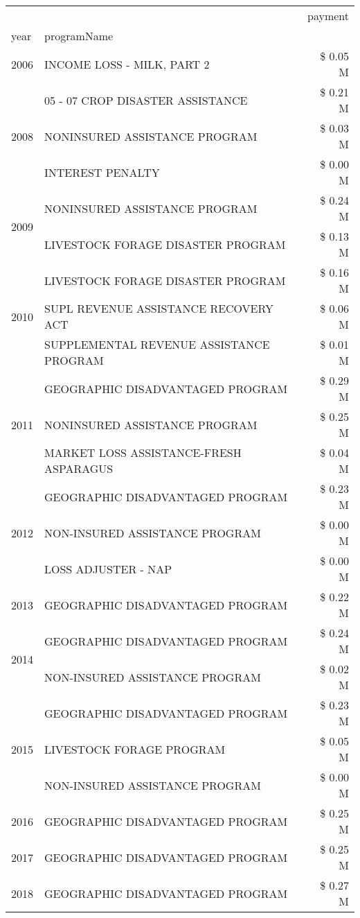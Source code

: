 \begin{tabular}{llr}
\toprule
 &  & payment \\
year & programName &  \\
\midrule
2006 & INCOME LOSS - MILK, PART 2 & \$ 0.05 M \\
\cline{1-3}
\multirow[t]{3}{*}{2008} & 05 - 07 CROP DISASTER ASSISTANCE & \$ 0.21 M \\
 & NONINSURED ASSISTANCE PROGRAM & \$ 0.03 M \\
 & INTEREST PENALTY & \$ 0.00 M \\
\cline{1-3}
\multirow[t]{2}{*}{2009} & NONINSURED ASSISTANCE PROGRAM & \$ 0.24 M \\
 & LIVESTOCK FORAGE DISASTER  PROGRAM & \$ 0.13 M \\
\cline{1-3}
\multirow[t]{3}{*}{2010} & LIVESTOCK FORAGE DISASTER  PROGRAM & \$ 0.16 M \\
 & SUPL REVENUE ASSISTANCE RECOVERY ACT & \$ 0.06 M \\
 & SUPPLEMENTAL REVENUE ASSISTANCE PROGRAM & \$ 0.01 M \\
\cline{1-3}
\multirow[t]{3}{*}{2011} & GEOGRAPHIC DISADVANTAGED PROGRAM & \$ 0.29 M \\
 & NONINSURED ASSISTANCE PROGRAM & \$ 0.25 M \\
 & MARKET LOSS ASSISTANCE-FRESH ASPARAGUS & \$ 0.04 M \\
\cline{1-3}
\multirow[t]{3}{*}{2012} & GEOGRAPHIC DISADVANTAGED PROGRAM & \$ 0.23 M \\
 & NON-INSURED ASSISTANCE PROGRAM & \$ 0.00 M \\
 & LOSS ADJUSTER - NAP & \$ 0.00 M \\
\cline{1-3}
2013 & GEOGRAPHIC DISADVANTAGED PROGRAM & \$ 0.22 M \\
\cline{1-3}
\multirow[t]{2}{*}{2014} & GEOGRAPHIC DISADVANTAGED PROGRAM & \$ 0.24 M \\
 & NON-INSURED ASSISTANCE PROGRAM & \$ 0.02 M \\
\cline{1-3}
\multirow[t]{3}{*}{2015} & GEOGRAPHIC DISADVANTAGED PROGRAM & \$ 0.23 M \\
 & LIVESTOCK FORAGE PROGRAM & \$ 0.05 M \\
 & NON-INSURED ASSISTANCE PROGRAM & \$ 0.00 M \\
\cline{1-3}
2016 & GEOGRAPHIC DISADVANTAGED PROGRAM              & \$ 0.25 M \\
\cline{1-3}
2017 & GEOGRAPHIC DISADVANTAGED PROGRAM & \$ 0.25 M \\
\cline{1-3}
\multirow[t]{3}{*}{2018} & GEOGRAPHIC DISADVANTAGED PROGRAM & \$ 0.27 M \\

\end{tabular}
